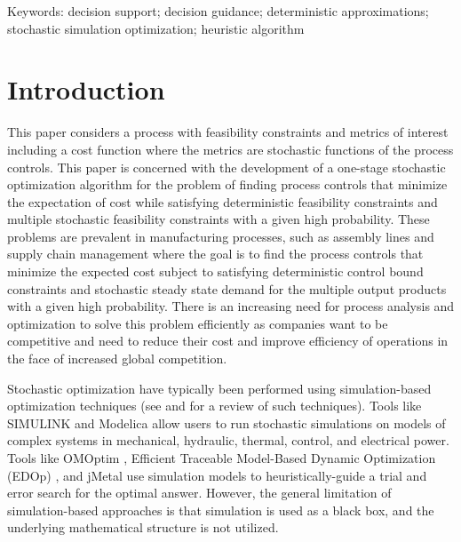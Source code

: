 \documentclass[a4paper, 12pt]{article} %
\begin{document}
{\small  Keywords: decision support;
	decision guidance;
	deterministic approximations;
	stochastic simulation optimization;
	heuristic algorithm } %

\vspace{5pt} %

\section{Introduction}

This paper considers a process with feasibility constraints and metrics of interest including a cost function where the metrics are stochastic functions of the process controls.
This paper is concerned with the development of a one-stage stochastic optimization algorithm for the problem of finding process controls that minimize the expectation of cost while satisfying deterministic feasibility constraints and multiple stochastic feasibility constraints with a given high probability.
These problems are prevalent in manufacturing processes, such as assembly lines and supply chain management where the goal is to find the process controls that minimize the expected cost subject to satisfying deterministic control bound constraints and stochastic steady state demand for the multiple output products with a given high probability. 
There is an increasing need for process analysis and optimization to solve this problem efficiently as companies want to be competitive and need to reduce their cost and improve efficiency of operations in the face of increased global competition. 


Stochastic optimization have typically been performed using simulation-based optimization techniques (see \cite{Amaran2016} and \cite{Nguyen2014} for a review of such techniques). 
Tools like SIMULINK \cite{Dabney:2001:MS:557989} and Modelica \cite{elmqvist1998modelica,Provan2012modelica} allow users to run stochastic simulations on models of complex systems in mechanical, hydraulic, thermal, control, and electrical power.
Tools like OMOptim \cite{OMOptim}, Efficient Traceable Model-Based Dynamic Optimization (EDOp) \cite{EDOp}, and jMetal \cite{jMetal} use simulation models to heuristically-guide a trial and error search for the optimal answer. 
However, the general limitation of simulation-based approaches is that simulation is used as a black box, and the underlying mathematical structure is not utilized. 
\end{document}
